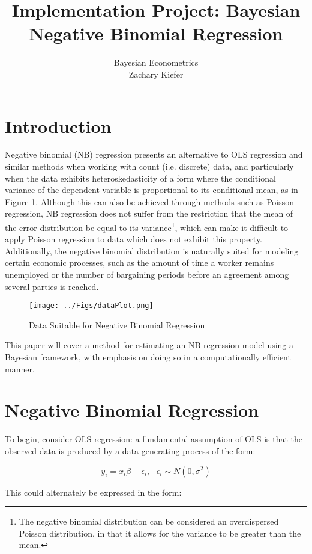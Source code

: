 \documentclass[12pt]{article}
\title{Implementation Project: Bayesian Negative Binomial Regression}
\author{Bayesian Econometrics\\Zachary Kiefer}
\begin{document}
	\maketitle
	\section{Introduction}
	Negative binomial (NB) regression presents an alternative to OLS regression and similar methods when working with count (i.e. discrete) data, and particularly when the data exhibits heteroskedasticity of a form where the conditional variance of the dependent variable is proportional to its conditional mean, as in Figure 1. Although this can also be achieved through methods such as Poisson regression, NB regression does not suffer from the restriction that the mean of the error distribution be equal to its variance\footnote{The negative binomial distribution can be considered an overdispersed Poisson distribution, in that it allows for the variance to be greater than the mean.}, which can make it difficult to apply Poisson regression to data which does not exhibit this property. Additionally, the negative binomial distribution is naturally suited for modeling certain economic processes, such as the amount of time a worker remains unemployed or the number of bargaining periods before an agreement among several parties is reached.
	
	\begin{figure}
		\caption{Data Suitable for Negative Binomial Regression}
		\centering
		\texttt{[image: ../Figs/dataPlot.png]}
	\end{figure}
	
	This paper will cover a method for estimating an NB regression model using a Bayesian framework, with emphasis on doing so in a computationally efficient manner.
	
	\pagebreak
	\section{Negative Binomial Regression}
	To begin, consider OLS regression: a fundamental assumption of OLS is that the observed data is produced by a data-generating process of the form:
	
	\begin{equation}
	y_i = x_i \beta + \epsilon_i,~~~\epsilon_i \sim N(0, \sigma^2)
	\end{equation}
	
	This could alternately be expressed in the form:
	
\end{document}
